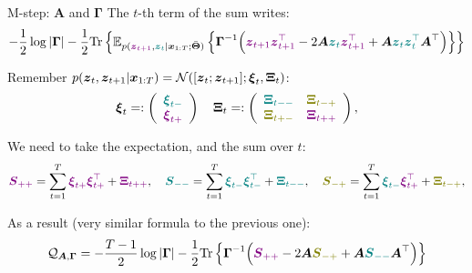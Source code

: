 \documentclass{beamer}
\newcommand{\myarray}[2]{\left(\begin{array}{#1}#2\end{array}\right)}
\newcommand{\bs}[1]{\boldsymbol{#1}}
\newcommand{\paint}[2]{{\color{#1}#2}}
\begin{document}
\begin{frame}{M-step: $\bs{A}$ and $\bs{\Gamma}$}
The $t$-th term of the sum writes:
{\small\begin{align*}
 -\frac{1}{2}\log|\bs{\Gamma}| -\frac{1}{2} \textrm{Tr}\left\{\mathbb{E}_{p(\paint{myfuture}{\bs{z}_{t+1}},\paint{mypresent}{\bs{z}_t}|\bs{x}_{1:T};\bar{\bs{\Theta}})}\left\{\bs{\Gamma}^{-1}\Big( \paint{myfuture}{\bs{z}_{t+1}\bs{z}_{t+1}^\top} - 2\bs{A}\paint{mypresent}{\bs{z}_{t}}\paint{myfuture}{\bs{z}_{t+1}^\top} +\bs{A}\paint{mypresent}{\bs{z}_{t}\bs{z}_{t}^\top}\bs{A}^\top  \Big)\right\}\right\}
 \end{align*}}\pause

Remember $p(\bs{z}_t,\bs{z}_{t+1}|\bs{x}_{1:T}) = {\cal N}([\bs{z}_{t};\bs{z}_{t+1}]; \bs{\xi}_t,\bs{\Xi}_t)$:
{\small\begin{equation*}
 \bs{\xi}_t =: \myarray{c}{\paint{mypresent}{\bs{\xi}_{t-}}\\\paint{myfuture}{\bs{\xi}_{t+}}} \quad \bs{\Xi}_t =: \myarray{cc}{ \paint{mypresent}{\bs{\Xi}_{t--}} & \paint{mymix}{\bs{\Xi}_{t-+}} \\ \paint{mymix}{\bs{\Xi}_{t+-}} & \paint{myfuture}{\bs{\Xi}_{t++}}},
\end{equation*}}\pause

We need to take the expectation, and the sum over $t$:
{\footnotesize
\begin{equation*}
 \paint{myfuture}{\bs{S}_{++}} = \sum_{t=1}^T \paint{myfuture}{\bs{\xi}_{t+}}\paint{myfuture}{\bs{\xi}_{t+}^\top} + \paint{myfuture}{\bs{\Xi}_{t++}}, \quad 
 \paint{mypresent}{\bs{S}_{--}} = \sum_{t=1}^T \paint{mypresent}{\bs{\xi}_{t-}}\paint{mypresent}{\bs{\xi}_{t-}^\top} + \paint{mypresent}{\bs{\Xi}_{t--}}, \quad
 \paint{mymix}{\bs{S}_{-+}} = \sum_{t=1}^T \paint{mypresent}{\bs{\xi}_{t-}}\paint{myfuture}{\bs{\xi}_{t+}^\top} + \paint{mymix}{\bs{\Xi}_{t-+}},
 \end{equation*}
}\pause

As a result (very similar formula to the previous one):
 {\small
 \begin{align*}
  \mathcal{Q}_{\bs{A},\bs{\Gamma}} = -\frac{T-1}{2}\log|\bs{\Gamma}| -\frac{1}{2} \textrm{Tr}\left\{\bs{\Gamma}^{-1}\Big( \paint{myfuture}{\bs{S}_{++}} - 2\bs{A}\paint{mymix}{\bs{S}_{-+}} +\bs{A}\paint{mypresent}{\bs{S}_{--}}\bs{A}^\top  \Big)\right\}
 \end{align*}
 }
\end{frame}
\end{document}
